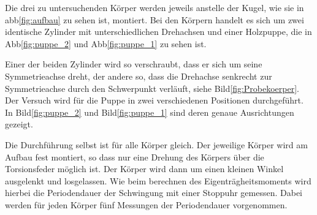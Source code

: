 Die drei zu untersuchenden Körper werden jeweils anstelle der Kugel, wie sie in abb\ref{fig:aufbau} zu sehen ist, montiert.
Bei den Körpern handelt es sich um zwei identische Zylinder mit unterschiedlichen Drehachsen und einer Holzpuppe, die in 
Abb\ref{fig:puppe_2} und Abb\ref{fig:puppe_1} zu sehen ist. 

Einer der beiden Zylinder wird so verschraubt, dass er sich um seine Symmetrieachse dreht, der andere so, dass die Drehachse senkrecht
zur Symmetrieachse durch den Schwerpunkt verläuft, siehe Bild\ref{fig:Probekoerper}. Der Versuch wird für die Puppe in zwei 
verschiedenen Positionen durchgeführt. In Bild\ref{fig:puppe_2} und Bild\ref{fig:puppe_1} sind deren genaue Ausrichtungen gezeigt. 

Die Durchführung selbst ist für alle Körper gleich. Der jeweilige Körper wird am Aufbau fest montiert, so dass nur eine Drehung des 
Körpers über die Torsionsfeder möglich ist. Der Körper wird dann um einen kleinen Winkel ausgelenkt und losgelassen. Wie beim berechnen
des Eigenträgheitsmoments wird hierbei die Periodendauer der Schwingung mit einer Stoppuhr gemessen. Dabei werden für jeden Körper 
fünf Messungen der Periodendauer vorgenommen. 



